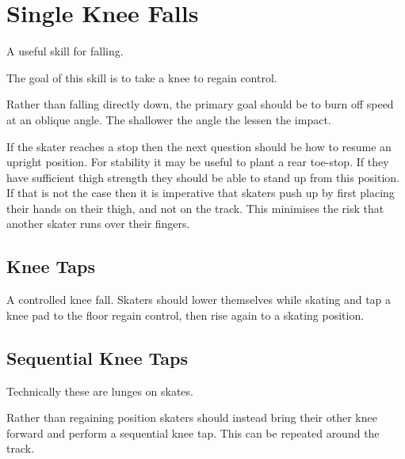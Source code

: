 \section{Single Knee Falls}
\label{sec:falls/knee_falls}

A useful skill for falling.

The goal of this skill is to take a knee to regain control. 

Rather than falling directly down, the primary goal should be to burn off speed at an oblique angle. 
The shallower the angle the lessen the impact. 


If the skater reaches a stop then the next question should be how to resume an upright position. 
For stability it may be useful to plant a rear toe-stop.
If they have sufficient thigh strength they should be able to stand up from this position. 
If that is not the case then it is imperative that skaters push up by first placing their hands on their thigh, and not on the track.  
This minimises the risk that another skater runs over their fingers.



\subsection*{Knee Taps}
A controlled knee fall.
Skaters should lower themselves while skating and tap a knee pad to the floor regain control, then rise again to a skating position.  



\subsection*{Sequential Knee Taps}
Technically these are lunges on skates.

Rather than regaining position skaters should instead bring their other knee forward and perform a sequential knee tap.   
This can be repeated around the track.
